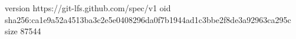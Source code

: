 version https://git-lfs.github.com/spec/v1
oid sha256:ca1e9a52a4513ba3c2e5e0408296da0f7b1944ad1c3bbe2f8de3a92963ca295c
size 87544
